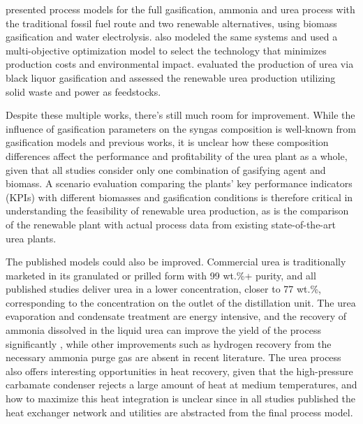 \documentclass[a4paper, titlepage]{article}
\begin{document}
\textcite{zhangTechnoeconomicComparison1002021} presented process models for the full gasification, ammonia and urea
process with the traditional fossil fuel route and two renewable alternatives, using biomass gasification and water
electrolysis. \textcite{alfianMultiobjectiveOptimizationGreen2019} also modeled the same systems and used a
multi-objective optimization model to select the technology that minimizes production costs and environmental impact.
\textcite{domingosExergyEnvironmentalAnalysis2021} evaluated the production of urea via black liquor gasification
and \textcite{gyanwaliTechnoeconomicAssessmentGreen2023} assessed the renewable urea production utilizing solid waste
and power as feedstocks.


Despite these multiple works, there's still much room for improvement. While the influence of gasification parameters
on the syngas composition is well-known from gasification models and previous works, it is unclear how these
composition differences affect the performance and profitability of the urea plant as a whole, given that all studies
consider only one combination of gasifying agent and biomass. A scenario evaluation comparing the plants’ key
performance indicators (KPIs) with different biomasses and gasification conditions is therefore critical in
understanding the feasibility of renewable urea production, as is the comparison of the renewable plant with
actual process data from existing state-of-the-art urea plants.

The published models could also be improved. Commercial urea is traditionally marketed in its granulated or prilled
form with 99 wt.\%+ purity, and all published studies deliver urea in a lower concentration, closer to 77 wt.\%,
corresponding to the concentration on the outlet of the distillation unit. The urea evaporation and condensate
treatment are energy intensive, and the recovery of ammonia dissolved in the liquid urea can improve the yield of the
process significantly \cite{meessenUreaSynthesis2014}, while other improvements such as hydrogen recovery from the
necessary ammonia purge gas are absent in recent literature. The urea process also offers interesting opportunities
in heat recovery, given that the high-pressure carbamate condenser rejects a large amount of heat at medium
temperatures, and how to maximize this heat integration is unclear since in all studies published the heat exchanger
network and utilities are abstracted from the final process model.








\printbibliography{}
\end{document}
